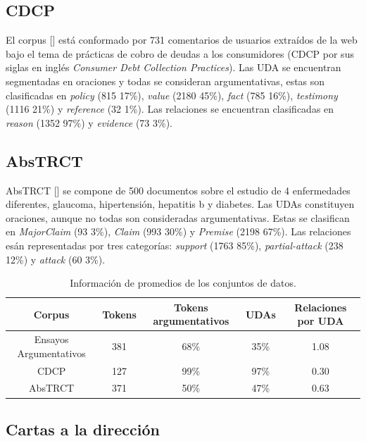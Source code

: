 \subsection{CDCP}\label{corpus:cdcp}

El corpus [\cite{niculae2017argument}] está conformado por 731 comentarios de usuarios extraídos de la web bajo el tema de 
prácticas de cobro de deudas a los consumidores (CDCP por sus siglas en inglés \emph{Consumer Debt Collection Practices}).
Las UDA se encuentran segmentadas en oraciones y todas se consideran argumentativas, estas son clasificadas en 
\emph{policy} (815 17\%), \emph{value} (2180 45\%), \emph{fact} (785 16\%), \emph{testimony} (1116 21\%) y \emph{reference} (32 1\%). 
Las relaciones se encuentran clasificadas en \emph{reason} (1352 97\%) y \emph{evidence} (73 3\%).

\subsection{AbsTRCT}

AbsTRCT [\cite{mayer2020transformer}] se compone de 500 documentos sobre el estudio de 4 enfermedades diferentes,
glaucoma, hipertensión, hepatitis b y diabetes. Las UDAs constituyen oraciones, aunque no todas son consideradas
argumentativas. Estas se clasifican en \emph{MajorClaim} (93 3\%), \emph{Claim} (993 30\%) y \emph{Premise} (2198 67\%).
Las relaciones esán representadas por tres categorías: \emph{support} (1763 85\%), \emph{partial-attack} (238 12\%) y
\emph{attack} (60 3\%).

\begin{table}[h!]
	\begin{center}
		\begin{tabular}{|c|c|c|c|c|} \hline
		Corpus		            & Tokens 	& Tokens argumentativos	& UDAs   & Relaciones por UDA    \\ \hline
		Ensayos Argumentativos  & 381		& 68\% 		& 35\% 	  & 1.08		\\ \hline
		CDCP		            & 127		& 99\% 		& 97\% 	  & 0.30		\\ \hline
		AbsTRCT	                & 371		& 50\% 		& 47\% 	  & 0.63		\\ \hline
		\end{tabular}
	\caption{Información de promedios de los conjuntos de datos.}\label{fig:corpus_info}
	\end{center}
\end{table}

\subsection{Cartas a la dirección}

